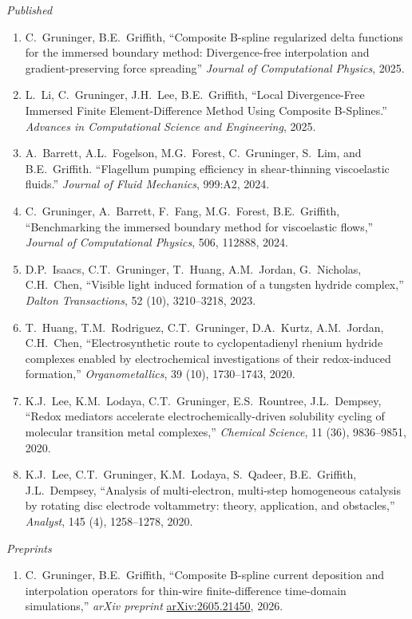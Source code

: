 \documentclass[10pt]{article}
\begin{document}
\textit{Published}
\begin{enumerate}[leftmargin=1.6em,itemsep=0.45em,topsep=0.35em]
  \item C.~Gruninger, B.E.~Griffith, ``Composite B-spline regularized delta functions for the immersed boundary method: Divergence-free interpolation and gradient-preserving force spreading'' \textit{Journal of Computational Physics}, 2025.
  \item L.~Li, C.~Gruninger, J.H.~Lee, B.E.~Griffith, ``Local Divergence-Free Immersed Finite Element-Difference Method Using Composite B-Splines.'' \textit{Advances in Computational Science and Engineering}, 2025.
  \item A.~Barrett, A.L.~Fogelson, M.G.~Forest, C.~Gruninger, S.~Lim, and B.E.~Griffith. ``Flagellum pumping efficiency in shear-thinning viscoelastic fluids.'' \textit{Journal of Fluid Mechanics}, 999:A2, 2024.
  \item C.~Gruninger, A.~Barrett, F.~Fang, M.G.~Forest, B.E.~Griffith, ``Benchmarking the immersed boundary method for viscoelastic flows,'' \textit{Journal of Computational Physics}, 506, 112888, 2024.
  \item D.P.~Isaacs, C.T.~Gruninger, T.~Huang, A.M.~Jordan, G.~Nicholas, C.H.~Chen, ``Visible light induced formation of a tungsten hydride complex,'' \textit{Dalton Transactions}, 52 (10), 3210--3218, 2023.
  \item T.~Huang, T.M.~Rodriguez, C.T.~Gruninger, D.A.~Kurtz, A.M.~Jordan, C.H.~Chen, ``Electrosynthetic route to cyclopentadienyl rhenium hydride complexes enabled by electrochemical investigations of their redox-induced formation,'' \textit{Organometallics}, 39 (10), 1730--1743, 2020.
  \item K.J.~Lee, K.M.~Lodaya, C.T.~Gruninger, E.S.~Rountree, J.L.~Dempsey, ``Redox mediators accelerate electrochemically-driven solubility cycling of molecular transition metal complexes,'' \textit{Chemical Science}, 11 (36), 9836--9851, 2020.
  \item K.J.~Lee, C.T.~Gruninger, K.M.~Lodaya, S.~Qadeer, B.E.~Griffith, J.L.~Dempsey, ``Analysis of multi-electron, multi-step homogeneous catalysis by rotating disc electrode voltammetry: theory, application, and obstacles,'' \textit{Analyst}, 145 (4), 1258--1278, 2020.
\end{enumerate}

\textit{Preprints}
\begin{enumerate}[leftmargin=1.6em,itemsep=0.45em,topsep=0.35em]
  \item C.~Gruninger, B.E.~Griffith, ``Composite B-spline current deposition and interpolation operators for thin-wire finite-difference time-domain simulations,'' \textit{arXiv preprint} \href{https://arxiv.org/abs/2605.21450}{arXiv:2605.21450}, 2026.
\end{enumerate}
\end{document}
